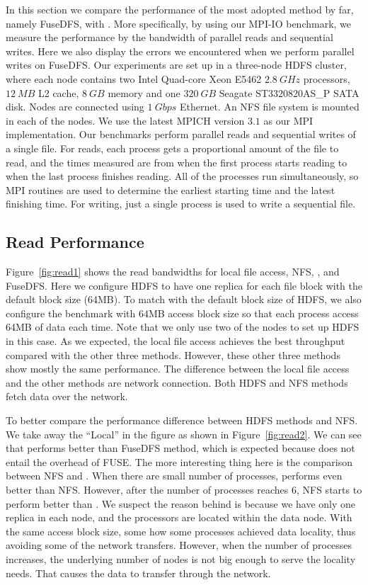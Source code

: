 In this section we compare the performance of the most adopted method by far,
namely FuseDFS, with {\proj}. More specifically, by using our MPI-IO benchmark,
we measure the performance by the bandwidth of parallel reads and sequential
writes. Here we also display the errors we encountered when we perform parallel
writes on FuseDFS. Our experiments are set up in a three-node HDFS cluster,
where each node contains two Intel Quad-core Xeon E5462 $2.8~GHz$ processors,
$12~MB$ L2 cache, $8~GB$ memory and one $320~GB$ Seagate ST3320820AS\_P SATA
disk. Nodes are connected using $1~Gbps$ Ethernet. An NFS file system is mounted
in each of the nodes. We use the latest MPICH
version $3.1$ as our MPI implementation. Our benchmarks perform parallel reads
and sequential writes of a single file. For reads, each process gets a proportional
amount of the file to read, and the times measured are from when the first process
starts reading to when the last process finishes reading. All of the processes run
simultaneously, so MPI routines are used to determine the earliest starting time
and the latest finishing time. For writing, just a single process is used to
write a sequential file.

\subsection{Read Performance}
Figure~\ref{fig:read1} shows the read bandwidths for local file access, NFS, {\proj},
and FuseDFS. Here we configure HDFS to have one replica for each file block with
the default block size (64MB). To match with the default block size of HDFS, we
also configure the benchmark with 64MB access block size so that each process
access 64MB of data each time. Note that we only use two of the nodes to set up
HDFS in this case. As we expected, the local file access achieves
the best throughput compared with the other three methods. However, these other three
methods show mostly the same performance. The
difference between the local file access and the other methods are network
connection. Both HDFS and NFS methods fetch data over the network.

To better compare the performance difference between HDFS methods and NFS. We
take away the ``Local'' in the figure as shown in Figure~\ref{fig:read2}. We 
can see that {\proj} performs better than FuseDFS method, which is expected
because {\proj} does not entail the overhead of FUSE. The more interesting thing
here is the comparison between NFS and {\proj}. When there are small
number of processes, {\proj} performs even better than NFS. However, after the
number of processes reaches 6, NFS starts to perform better than {\proj}. We
suspect the reason behind is because we have only one replica in each node, and
the processors are located within the data node. With the same access block
size, some how some processes achieved data locality, thus avoiding some of the
network transfers. However, when the number of processes increases, the
underlying number of nodes is not big enough to serve the locality needs. That
causes the data to transfer through the network.


